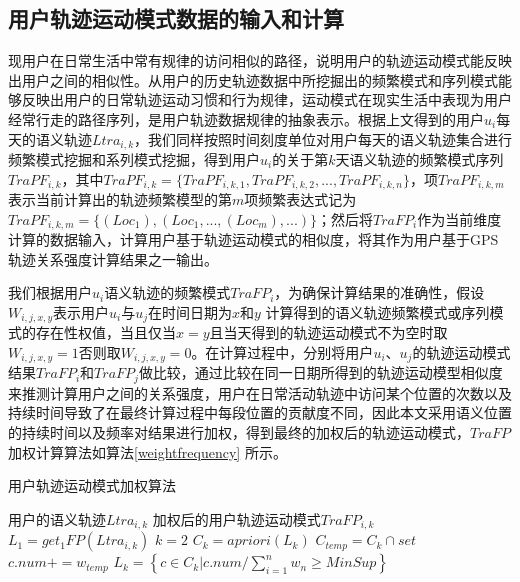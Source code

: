 \subsection{用户轨迹运动模式数据的输入和计算}
现用户在日常生活中常有规律的访问相似的路径，说明用户的轨迹运动模式能反映出用户之间的相似性。从用户的历史轨迹数据中所挖掘出的频繁模式和序列模式能够反映出用户的日常轨迹运动习惯和行为规律，运动模式在现实生活中表现为用户经常行走的路径序列，是用户轨迹数据规律的抽象表示。根据上文得到的用户$u_{i}$每天的语义轨迹$Ltra_{i,k}$，我们同样按照时间刻度单位对用户每天的语义轨迹集合进行频繁模式挖掘和系列模式挖掘，得到用户$u_{i}$的关于第$k$天语义轨迹的频繁模式序列$TraPF_{i,k}$，其中$TraPF_{i,k}=\{ TraPF_{i,k,1},TraPF_{i,k,2},...,TraPF_{i,k,n} \}$，项$TraPF_{i,k,m}$表示当前计算出的轨迹频繁模型的第$m$项频繁表达式记为$TraPF_{i,k,m}=\{  (Loc_{1}),(Loc_{1},...,(Loc_{m}),...)  \}$；然后将$TraFP_{i}$作为当前维度计算的数据输入，计算用户基于轨迹运动模式的相似度，将其作为用户基于GPS轨迹关系强度计算结果之一输出。
\par 我们根据用户$u_{i}$语义轨迹的频繁模式$TraFP_{i}$，为确保计算结果的准确性，假设$W_{i,j,x,y}$表示用户$u_{i}$与$u_{j}$在时间日期为$x$和$y$ 计算得到的语义轨迹频繁模式或序列模式的存在性权值，当且仅当$x=y$且当天得到的轨迹运动模式不为空时取$W_{i,j,x,y}=1$否则取$W_{i,j,x,y}=0$。在计算过程中，分别将用户$u_{i}$、$u_{j}$的轨迹运动模式结果$TraFP_{i}$和$TraFP_{j}$做比较，通过比较在同一日期所得到的轨迹运动模型相似度来推测计算用户之间的关系强度，用户在日常活动轨迹中访问某个位置的次数以及持续时间导致了在最终计算过程中每段位置的贡献度不同，因此本文采用语义位置的持续时间以及频率对结果进行加权，得到最终的加权后的轨迹运动模式，$TraFP$加权计算算法如算法\ref{weightfrequency} 所示。
\begin{algorithm}[H]
    \wuhao
    \caption{用户轨迹运动模式加权算法}
    \label{weightfrequency}
    \begin{algorithmic}[1] %
    \REQUIRE 用户的语义轨迹$Ltra_{i,k}$
    \ENSURE 加权后的用户轨迹运动模式$TraFP_{i,k}$
    \STATE $L_{1}= get_{1}FP(Ltra_{i,k})$
    \STATE $k=2$
    \STATE $C_{k}=apriori(L_{k})$
    \STATE $C_{temp}=C_{k}\cap set$
    \STATE $c.num+=w_{temp}$
    \ENDFOR
    \ENDFOR	
    \STATE \mbox{{$L_{k} = \left \{   c\in C_{k}  |  c.num /\sum_{i=1}^{n}w_{n} \geq MinSup  \right \}$ }}
    \ENDWHILE
\end{algorithmic}
\end{algorithm}
